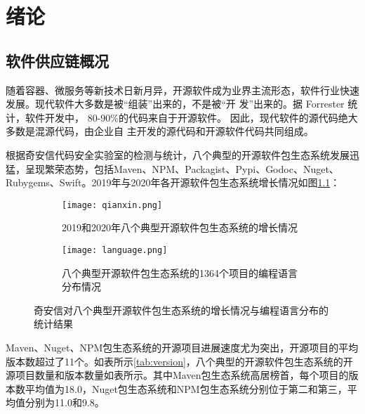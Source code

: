 
\chapter{绪论}

\section{软件供应链概况}
随着容器、微服务等新技术日新月异，开源软件成为业界主流形态，软件行业快速发展。现代软件大多数是被“组装”出来的，不是被“开
发”出来的。据 Forrester 统计，软件开发中， 80-90\%的代码来自于开源软件。 因此，现代软件的源代码绝大多数是混源代码，由企业自
主开发的源代码和开源软件代码共同组成\cite{qianxin.com}。

根据奇安信代码安全实验室的检测与统计\cite{qianxin.com}，八个典型的开源软件包生态系统发展迅猛，呈现繁荣态势，包括Maven、NPM、Packagist、Pypi、Godoc、Nuget、Rubygems、Swift。2019年与2020年各开源软件包生态系统增长情况如图\ref{fig:qianxin}：


\begin{figure}[!htp]
  \centering
  \begin{subfigure}{0.4\textwidth}
    \centering
    \texttt{[image: qianxin.png]}
    \caption{2019和2020年八个典型开源软件包生态系统的增长情况}
	\label{fig:qianxin}
  \end{subfigure}
  \hspace{1cm}
  \begin{subfigure}{0.3\textwidth}
    \centering
    \texttt{[image: language.png]}
    \caption{八个典型开源软件包生态系统的1364个项目的编程语言分布情况}
	\label{fig:language}
  \end{subfigure}
  \caption{奇安信对八个典型开源软件包生态系统的增长情况与编程语言分布的统计结果}
  \label{fig:subfigure}
\end{figure}

Maven、Nuget、NPM包生态系统的开源项目进展速度尤为突出，开源项目的平均版本数超过了11个。如表所示\ref{tab:version}，八个典型的开源软件包生态系统的开源项目数量和版本数量如表所示。其中Maven包生态系统高居榜首，每个项目的版本数平均值为18.0，Nuget包生态系统和NPM包生态系统分别位于第二和第三，平均值分别为11.0和9.8\cite{qianxin.com}。

